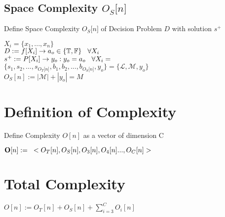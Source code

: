\documentclass[11pt]{article}
\begin{document}
\subsection{Space Complexity $O_S \lbrack n \rbrack$}
Define Space Complexity $O_S \lbrack n \rbrack$ of Decision Problem $D$ with solution $s^+$
\begin{center}
$
X_i = \{x_1,...,x_n\}
$
\\ \vspace{2mm}
$
D := f \lbrack X_i \rbrack \rightarrow a_{o} \in \{\mathbb{T}, \mathbb{F}\} \hspace{3mm} \forall X_i
$
\\ \vspace{2mm}
$
s^+ := P \lbrack X_i \rbrack \rightarrow y_{o} : y_o = a_{o} \hspace{3mm} \forall X_i =
$
\\ \vspace{2mm}
$
\{ s_1,s_2,...,s_{O_T \lbrack n \rbrack }, b_1, b_2,...,b_{O_S \lbrack n \rbrack},y_o \} = \{ \mathcal{L},\mathcal{M},y_o\}
$
\\ \vspace{2mm}
$
O_S[n] := |\mathcal{M}|+|y_o| = M
$
\end{center}





\section{Definition of Complexity}
Define Complexity $O[n]$ as a vector of dimension C
\begin{center}
$
\bold{O}[n] := \hspace{3mm} < O_T [n], O_S [n],O_3[n],O_4[n]...,O_C[n]>
$
\end{center}

\section{Total Complexity}
\begin{center}
$O[n] := O_T[n] + O_S[n] + \sum_{i=3}^{C} O_i[n]$
\end{center}
\end{document}
